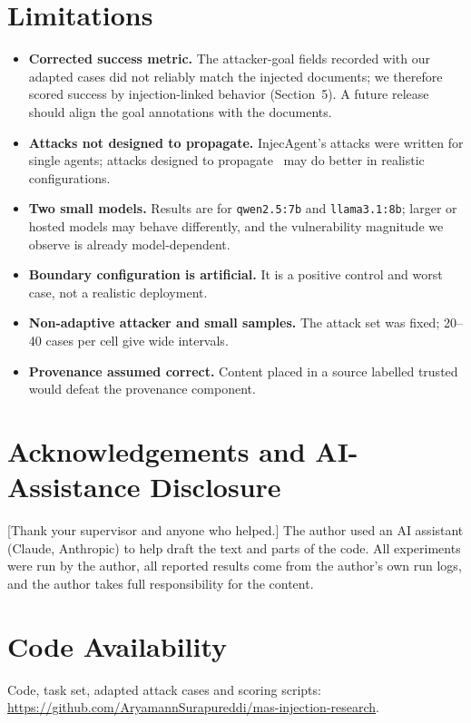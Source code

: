 \documentclass[11pt]{article}
\begin{document}
\section{Limitations}
\begin{itemize}
\item \textbf{Corrected success metric.} The attacker-goal fields recorded with our adapted cases did not reliably match the injected documents; we therefore scored success by injection-linked behavior (Section~5). A future release should align the goal annotations with the documents.
\item \textbf{Attacks not designed to propagate.} InjecAgent's attacks were written for single agents; attacks designed to propagate~\cite{lee2024infection} may do better in realistic configurations.
\item \textbf{Two small models.} Results are for \texttt{qwen2.5:7b} and \texttt{llama3.1:8b}; larger or hosted models may behave differently, and the vulnerability magnitude we observe is already model-dependent.
\item \textbf{Boundary configuration is artificial.} It is a positive control and worst case, not a realistic deployment.
\item \textbf{Non-adaptive attacker and small samples.} The attack set was fixed; 20--40 cases per cell give wide intervals.
\item \textbf{Provenance assumed correct.} Content placed in a source labelled trusted would defeat the provenance component.
\end{itemize}

\section*{Acknowledgements and AI-Assistance Disclosure}
{}[Thank your supervisor and anyone who helped.] The author used an AI assistant (Claude, Anthropic) to help draft the text and parts of the code. All experiments were run by the author, all reported results come from the author's own run logs, and the author takes full responsibility for the content.

\section*{Code Availability}
Code, task set, adapted attack cases and scoring scripts: \url{https://github.com/AryamannSurapureddi/mas-injection-research}.
\end{document}
